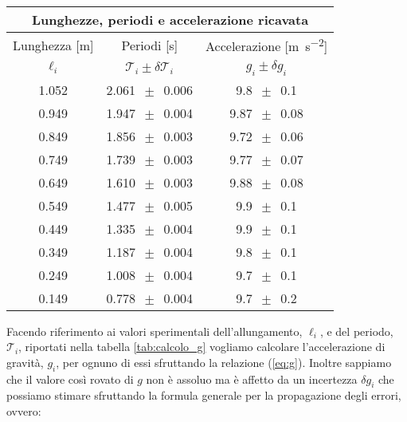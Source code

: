 \begin{SCtable}
    \centering
    \begin{tabular}{c c c}
        \multicolumn{3}{c}{\textbf{Lunghezze, periodi e accelerazione ricavata}} \\
        \toprule
        Lunghezza [\si{\metre}] & Periodi [\si{\second}] & Accelerazione [\si{\metre\per\square\second}] \\ %
        $\ell_i$ & $\mathcal{T}_i \pm \delta\mathcal{T}_i$ & $g_i \pm \delta g_i$ \\
        \midrule
			1.052 & 2.061 $\,\pm\,$ 0.006 & 9.8 $\,\pm\,$ 0.1 \\
			0.949 & 1.947 $\,\pm\,$ 0.004 & 9.87 $\,\pm\,$ 0.08 \\
			0.849 & 1.856 $\,\pm\,$ 0.003 & 9.72 $\,\pm\,$ 0.06 \\
			0.749 & 1.739 $\,\pm\,$ 0.003 & 9.77 $\,\pm\,$ 0.07 \\
			0.649 & 1.610 $\,\pm\,$ 0.003 & 9.88 $\,\pm\,$ 0.08 \\
			0.549 & 1.477 $\,\pm\,$ 0.005 & 9.9 $\,\pm\,$ 0.1 \\
			0.449 & 1.335 $\,\pm\,$ 0.004 & 9.9 $\,\pm\,$ 0.1 \\
			0.349 & 1.187 $\,\pm\,$ 0.004 & 9.8 $\,\pm\,$ 0.1 \\
			0.249 & 1.008 $\,\pm\,$ 0.004 & 9.7 $\,\pm\,$ 0.1 \\
			0.149 & 0.778 $\,\pm\,$ 0.004 & 9.7 $\,\pm\,$ 0.2 \\
		\bottomrule
    \end{tabular}
    \caption{In questa tebella sono riportate nella prima colonna le misure della lunghezza del filo che sono tutte affette da un'incertezza di 0.0006 m ricavata nel paragrafo precedente al punto \ref{l_medie}. Nella seconda colonna sono riportati i valori medi del periodo di oscillazione del pendolo relativo a ciascuna lunghezza. Infine nella terza colonna sono riportati i valori di $g_i$ derivanti dai dati grazie alle equazioni (\ref{eq:g}) e (\ref{eq:delta_g}). Per maggiori informazioni sulle prime due colonne si faccia riferimento alla Tabella \ref{tab:l_dati}, che commenta anche l'origine delle misure e la loro incertezza.}
    \label{tab:calcolo_g}
\end{SCtable}

Facendo riferimento ai valori sperimentali dell'allungamento, $\ell_i$, e del periodo, $\mathcal{T}_i$, riportati nella tabella \ref{tab:calcolo_g} vogliamo calcolare l'accelerazione di gravità, $g_i$, per ognuno di essi sfruttando la relazione (\ref{eq:g}). Inoltre sappiamo che il valore così rovato di $g$ non è assoluo ma è affetto da un incertezza $\delta g_i$ che possiamo stimare sfruttando la formula generale per la propagazione degli errori, ovvero:

